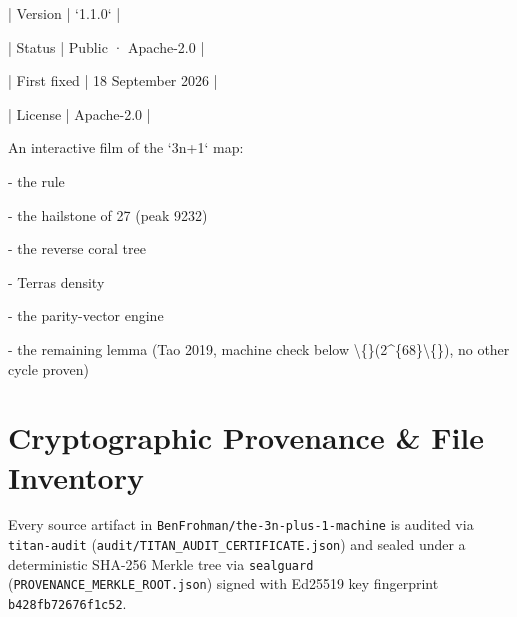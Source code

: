 \documentclass[11pt,a4paper]{article}
\begin{document}
| Version | `1.1.0` |

| Status | Public · Apache-2.0 |

| First fixed | 18 September 2026 |

| License | Apache-2.0 |

An interactive film of the `3n+1` map:

- the rule

- the hailstone of 27 (peak 9232)

- the reverse coral tree

- Terras density

- the parity-vector engine

- the remaining lemma (Tao 2019, machine check below \textbackslash\{\}(2\textasciicircum{}\{68\}\textbackslash\{\}), no other cycle proven)

\section{Cryptographic Provenance \& File Inventory}
Every source artifact in \texttt{BenFrohman/the-3n-plus-1-machine} is audited via \texttt{titan-audit}
(\texttt{audit/TITAN\_AUDIT\_CERTIFICATE.json}) and sealed under a deterministic SHA-256 Merkle tree via
\texttt{sealguard} (\texttt{PROVENANCE\_MERKLE\_ROOT.json}) signed with Ed25519 key fingerprint
\texttt{b428fb72676f1c52}.
\end{document}
